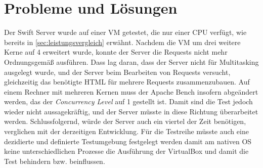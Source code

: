 \section{Probleme und Lösungen}
Der Swift Server wurde auf einer VM getestet, die nur einer CPU verfügt, wie bereits in \ref{sec:leistungsvergleich} erwähnt. Nachdem die VM um drei weitere Kerne auf 4 erweitert wurde, konnte der Server die Requests nicht mehr Ordnungsgemäß ausführen. Dass lag daran, dass der Server nicht für Multitasking ausgelegt wurde, und der Server beim Bearbeiten von Requests versucht, gleichzeitig das benötigte HTML für mehrere Requests zusammenzubauen. Auf einem Rechner mit mehreren Kernen muss der Apache Bench insofern abgeändert werden, das der \textit{Concurrency Level} auf 1 gestellt ist. Damit sind die Test jedoch wieder nicht aussagekräftig, und der Server müsste in diese Richtung überarbeitet werden. Schlussfolgernd, würde der Server auch ein viertel der Zeit benötigen, verglichen mit der derzeitigen Entwicklung.
Für die Testreihe müsste auch eine dezidierte und definierte Testumgebung festgelegt werden damit am nativen OS keine unterschiedlichen Prozesse die Ausführung der VirtualBox und damit die Test behindern bzw. beinflussen.

\chapterend

